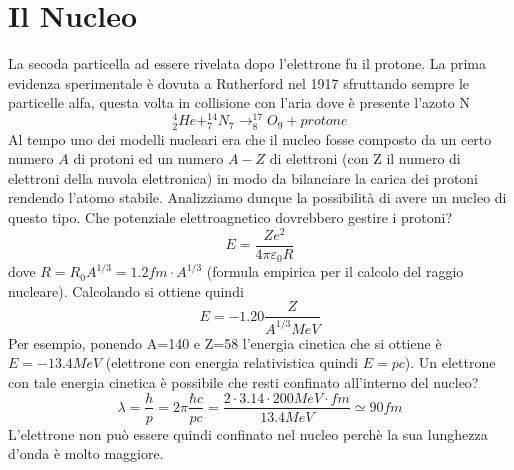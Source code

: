 \section{Il Nucleo}
La secoda particella ad essere rivelata dopo l'elettrone fu il protone. 
La prima evidenza sperimentale è dovuta a Rutherford nel 1917 sfruttando sempre le particelle alfa, questa volta in collisione con l'aria dove è presente l'azoto N 
\begin{equation}
^4_2He +^{14}_{7}N_{7}\longrightarrow ^{17}_8O_9+protone
\end{equation}
Al tempo uno dei modelli nucleari era che il nucleo fosse composto da un certo numero $A$ di protoni ed un numero $A-Z$ di elettroni (con Z il numero di elettroni della nuvola elettronica) in modo da bilanciare la carica dei protoni rendendo l'atomo stabile.
Analizziamo dunque la possibilità di avere un nucleo di questo tipo.
Che potenziale elettroagnetico dovrebbero gestire i protoni?
\[E=\frac{Ze^2}{4\pi\varepsilon_0R}\]
dove $R=R_0 A^{1/3}=1.2fm\cdot A^{1/3}$ (formula empirica per il calcolo del raggio nucleare). 
Calcolando si ottiene quindi
\[E=-1.20\frac{Z}{A^{1/3}MeV}\]
Per esempio, ponendo A=140 e Z=58 l'energia cinetica che si ottiene è $E=-13.4MeV$ (elettrone con energia relativistica quindi $E=pc$). Un elettrone con tale energia cinetica è possibile che resti confinato all'interno del nucleo?
\[\lambda=\frac{h}{p}=2\pi \frac{\hbar c}{pc}=\frac{2\cdot 3.14\cdot 200MeV\cdot fm}{13.4MeV}\simeq 90fm\]
L'elettrone non può essere quindi confinato nel nucleo perchè la sua lunghezza d'onda è molto maggiore.

